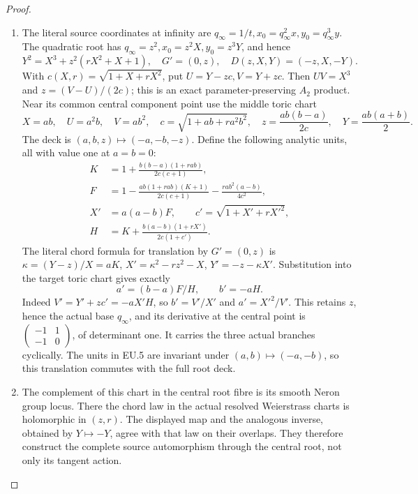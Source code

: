 \begin{proof}
\begin{enumerate}[label=\arabic*.]
\medskip\noindent\textbf{EU.3. The whole quadratic root, translation and line charts}

\par\nobreak

\item The literal source coordinates at infinity are
\(q_\infty=1/t,x_0=q_\infty^2x,y_0=q_\infty^3y\). The quadratic
root has \(q_\infty=z^2,x_0=z^2X,y_0=z^3Y\), and hence
\[
 Y^2=X^3+z^2(rX^2+X+1),\quad G'=(0,z),\quad
 D(z,X,Y)=(-z,X,-Y).
\]
With \(c(X,r)=\sqrt{1+X+rX^2}\), put \(U=Y-zc,V=Y+zc\).
Then \(UV=X^3\) and \(z=(V-U)/(2c)\); this is an exact
parameter-preserving \(A_2\) product. Near its common central
component point use the middle toric chart
\[
 X=ab,\quad U=a^2b,\quad V=ab^2,\quad
 c=\sqrt{1+ab+ra^2b^2},\quad
 z=\frac{ab(b-a)}{2c},\quad Y=\frac{ab(a+b)}2.
 \tag{EU.4}
\]
The deck is \((a,b,z)\mapsto(-a,-b,-z)\). Define the following
analytic units, all with value one at \(a=b=0\):
\[
\begin{aligned}
 K&=1+\frac{b(b-a)(1+rab)}{2c(c+1)},\\
 F&=1-\frac{ab(1+rab)(K+1)}{2c(c+1)}
           -\frac{ra b^2(a-b)}{4c^2},\\
 X'&=a(a-b)F,\qquad c'=\sqrt{1+X'+rX'^2},\\
 H&=K+\frac{b(a-b)(1+rX')}{2c(1+c')}.
\end{aligned}
 \tag{EU.5}
\]
The literal chord formula for translation by \(G'=(0,z)\) is
\(\kappa=(Y-z)/X=aK\),
\(X'=\kappa^2-rz^2-X\), \(Y'=-z-\kappa X'\).
Substitution into the target toric chart gives exactly
\[
                 a'=(b-a)F/H,\qquad b'=-aH.
 \tag{EU.6}
\]
Indeed \(V'=Y'+zc'=-aX'H\), so \(b'=V'/X'\) and
\(a'=X'^2/V'\). This retains \(z\), hence the actual base
\(q_\infty\), and its derivative at the central point is
\(\left(\begin{smallmatrix}-1&1\\-1&0\end{smallmatrix}\right)\),
of determinant one. It carries the three actual branches cyclically.
The units in EU.5 are invariant under \((a,b)\mapsto(-a,-b)\), so
this translation commutes with the full root deck.

\item The complement of this chart in the central root fibre is its smooth
Neron group locus. There the chord law in the actual resolved
Weierstrass charts is holomorphic in \((z,r)\). The displayed map and
the analogous inverse, obtained by \(Y\mapsto-Y\), agree with that
law on their overlaps. They therefore construct the complete source
automorphism through the central root, not only its tangent action.


\end{enumerate}
\end{proof}
